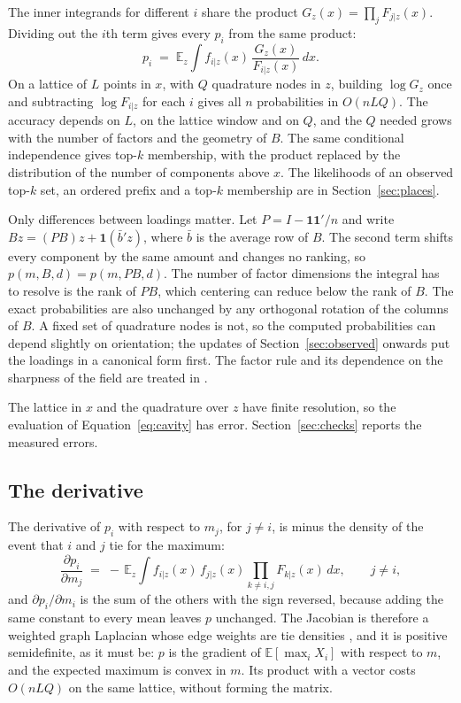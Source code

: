\documentclass[11pt]{article}
\begin{document}
The inner integrands for different $i$ share the product
$G_z(x) = \prod_j F_{j|z}(x)$. Dividing out the $i$th term gives
every $p_i$ from the same product:
\begin{equation}
p_i \;=\; \mathbb{E}_z \int f_{i|z}(x)\,
\frac{G_z(x)}{F_{i|z}(x)} \, dx .
\label{eq:cavity}
\end{equation}
On a lattice of $L$ points in $x$, with $Q$ quadrature nodes in $z$,
building $\log G_z$ once and subtracting $\log F_{i|z}$ for each $i$
gives all $n$ probabilities in $O(nLQ)$. The accuracy depends on
$L$, on the lattice window and on $Q$, and the $Q$ needed grows with
the number of factors and the geometry of $B$. The same conditional
independence gives top-$k$ membership, with the product replaced by
the distribution of the number of components above $x$. The
likelihoods of an observed top-$k$ set, an ordered prefix and a
top-$k$ membership are in Section~\ref{sec:places}.

Only differences between loadings matter. Let $P = I - \mathbf{1}
\mathbf{1}'/n$ and write $B z = (PB) z + \mathbf{1}(\bar{b}' z)$,
where $\bar{b}$ is the average row of $B$. The second term shifts
every component by the same amount and changes no ranking, so
$p(m, B, d) = p(m, PB, d)$. The number of factor dimensions the
integral has to resolve is the rank of $PB$, which centering can
reduce below the rank of $B$. The exact probabilities are also
unchanged by any orthogonal rotation of the columns of $B$. A fixed
set of quadrature nodes is not, so the computed probabilities can
depend slightly on orientation; the updates of Section~\ref{sec:observed}
onwards put the loadings in a canonical form first. The factor rule
and its dependence on the sharpness of the field are treated in
\citet[\S4.1]{cotton2026}.

The lattice in $x$ and the quadrature over $z$ have finite
resolution, so the evaluation of Equation~\eqref{eq:cavity} has
error. Section~\ref{sec:checks} reports the measured errors.

\subsection{The derivative}
\label{sec:jacobian}

The derivative of $p_i$ with respect to $m_j$, for $j\ne i$, is minus
the density of the event that $i$ and $j$ tie for the maximum:
\begin{equation}
\frac{\partial p_i}{\partial m_j} \;=\; -\,\mathbb{E}_z \int
f_{i|z}(x)\, f_{j|z}(x) \prod_{k\ne i,j} F_{k|z}(x)\, dx ,
\qquad j \ne i,
\label{eq:tie}
\end{equation}
and $\partial p_i/\partial m_i$ is the sum of the others with the
sign reversed, because adding the same constant to every mean leaves
$p$ unchanged. The Jacobian is
therefore a weighted graph Laplacian whose edge weights are tie
densities \citep[\S5]{cotton2026}, and it is positive semidefinite,
as it must be: $p$ is the gradient of $\mathbb{E}[\max_i X_i]$ with
respect to $m$, and the expected maximum is convex in $m$. Its product with a vector costs
$O(nLQ)$ on the same lattice, without forming the matrix.
\end{document}
